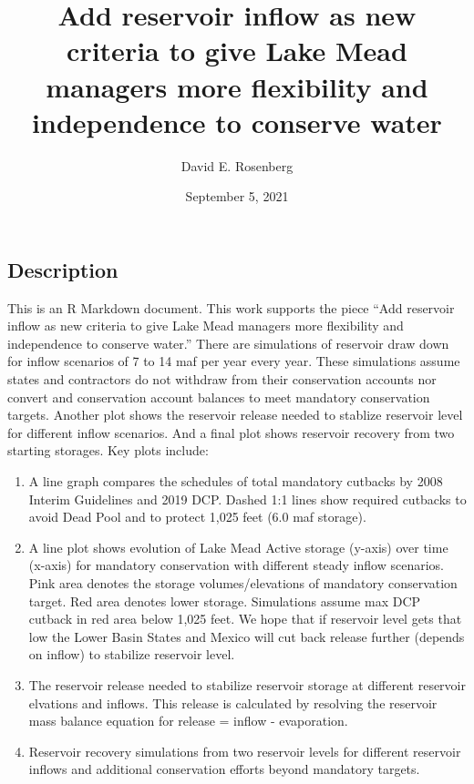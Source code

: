 \documentclass[]{article}
\title{Add reservoir inflow as new criteria to give Lake Mead managers more
flexibility and independence to conserve water}
\author{David E. Rosenberg}
\date{September 5, 2021}
\begin{document}
\maketitle

\subsection{Description}\label{description}

This is an R Markdown document. This work supports the piece ``Add
reservoir inflow as new criteria to give Lake Mead managers more
flexibility and independence to conserve water.'' There are simulations
of reservoir draw down for inflow scenarios of 7 to 14 maf per year
every year. These simulations assume states and contractors do not
withdraw from their conservation accounts nor convert and conservation
account balances to meet mandatory conservation targets. Another plot
shows the reservoir release needed to stablize reservoir level for
different inflow scenarios. And a final plot shows reservoir recovery
from two starting storages. Key plots include:

\begin{enumerate}
\def\labelenumi{\arabic{enumi}.}
\item
  A line graph compares the schedules of total mandatory cutbacks by
  2008 Interim Guidelines and 2019 DCP. Dashed 1:1 lines show required
  cutbacks to avoid Dead Pool and to protect 1,025 feet (6.0 maf
  storage).
\item
  A line plot shows evolution of Lake Mead Active storage (y-axis) over
  time (x-axis) for mandatory conservation with different steady inflow
  scenarios. Pink area denotes the storage volumes/elevations of
  mandatory conservation target. Red area denotes lower storage.
  Simulations assume max DCP cutback in red area below 1,025 feet. We
  hope that if reservoir level gets that low the Lower Basin States and
  Mexico will cut back release further (depends on inflow) to stabilize
  reservoir level.
\item
  The reservoir release needed to stabilize reservoir storage at
  different reservoir elvations and inflows. This release is calculated
  by resolving the reservoir mass balance equation for release = inflow
  - evaporation.
\item
  Reservoir recovery simulations from two reservoir levels for different
  reservoir inflows and additional conservation efforts beyond mandatory
  targets.
\end{enumerate}
\end{document}
